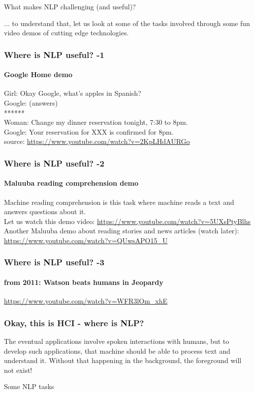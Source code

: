 \documentclass{beamer}
\begin{document}
\begin{frame}
\frametitle{}
\begin{center}
What makes NLP challenging (and useful)?
\end{center}
... to understand that, let us look at some of the tasks involved through some fun video demos of cutting edge technologies.
\end{frame}

\begin{frame}
\frametitle{Where is NLP useful? -1}
\framesubtitle{Google Home demo}
Girl: Okay Google, what's apples in Spanish?
\\ Google: (answers)
\\ ****** 
\\ Woman: Change my dinner reservation tonight, 7:30 to 8pm.
\\ Google: Your reservation for XXX is confirmed for 8pm. 
\\ source: \url{https://www.youtube.com/watch?v=2KpLHdAURGo}
\end{frame}

\begin{frame}
\frametitle{Where is NLP useful? -2}
\framesubtitle{Maluuba reading comprehension demo}
Machine reading comprehension is this task where machine reads a text and answers questions about it.
\\ Let us watch this demo video: \url{https://www.youtube.com/watch?v=5UXsPtyBlhs}
\\ \bigskip Another Maluuba demo about reading stories and news articles (watch later): \url{https://www.youtube.com/watch?v=QUwsAPO15_U}
\end{frame}

\begin{frame}
\frametitle{Where is NLP useful? -3}
\framesubtitle{from 2011: Watson beats humans in Jeopardy}
\url{https://www.youtube.com/watch?v=WFR3lOm_xhE}
\end{frame}

\begin{frame}
\frametitle{Okay, this is HCI - where is NLP?}
The eventual applications involve spoken interactions with humans, but to develop such applications, that machine should be able to process text and understand it. Without that happening in the background, the foreground will not exist!
\end{frame}

\begin{frame}
\begin{center}
\Large Some NLP tasks 
\end{center}
\end{frame}
\end{document}

